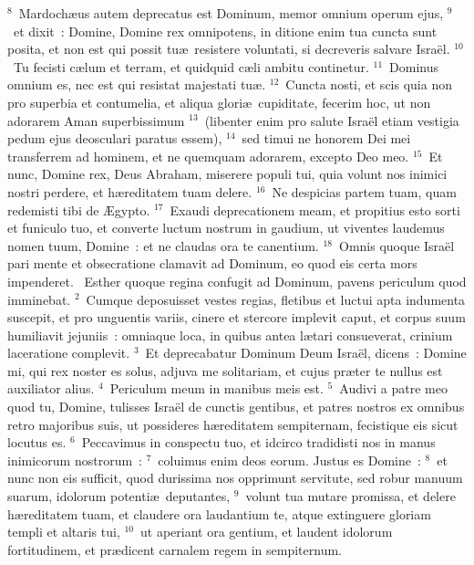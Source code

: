 ${}^{8}$~Mardoch\ae us autem deprecatus est Dominum, memor omnium operum ejus,
${}^{9}$~et dixit~: Domine, Domine rex omnipotens, in ditione enim tua cuncta sunt posita, et non est qui possit tu\ae\ resistere voluntati, si decreveris salvare Isra\"el.
${}^{10}$~Tu fecisti c\ae lum et terram, et quidquid c\ae li ambitu continetur.
${}^{11}$~Dominus omnium es, nec est qui resistat majestati tu\ae .
${}^{12}$~Cuncta nosti, et scis quia non pro superbia et contumelia, et aliqua glori\ae\ cupiditate, fecerim hoc, ut non adorarem Aman superbissimum
${}^{13}$~(libenter enim pro salute Isra\"el etiam vestigia pedum ejus deosculari paratus essem),
${}^{14}$~sed timui ne honorem Dei mei transferrem ad hominem, et ne quemquam adorarem, excepto Deo meo.
${}^{15}$~Et nunc, Domine rex, Deus Abraham, miserere populi tui, quia volunt nos inimici nostri perdere, et h\ae reditatem tuam delere.
${}^{16}$~Ne despicias partem tuam, quam redemisti tibi de \AE gypto.
${}^{17}$~Exaudi deprecationem meam, et propitius esto sorti et funiculo tuo, et converte luctum nostrum in gaudium, ut viventes laudemus nomen tuum, Domine~: et ne claudas ora te canentium.
${}^{18}$~Omnis quoque Isra\"el pari mente et obsecratione clamavit ad Dominum, eo quod eis certa mors impenderet.
~Esther quoque regina confugit ad Dominum, pavens periculum quod imminebat.
${}^{2}$~Cumque deposuisset vestes regias, fletibus et luctui apta indumenta suscepit, et pro unguentis variis, cinere et stercore implevit caput, et corpus suum humiliavit jejuniis~: omniaque loca, in quibus antea l\ae tari consueverat, crinium laceratione complevit.
${}^{3}$~Et deprecabatur Dominum Deum Isra\"el, dicens~: Domine mi, qui rex noster es solus, adjuva me solitariam, et cujus pr\ae ter te nullus est auxiliator alius.
${}^{4}$~Periculum meum in manibus meis est.
${}^{5}$~Audivi a patre meo quod tu, Domine, tulisses Isra\"el de cunctis gentibus, et patres nostros ex omnibus retro majoribus suis, ut possideres h\ae reditatem sempiternam, fecistique eis sicut locutus es.
${}^{6}$~Peccavimus in conspectu tuo, et idcirco tradidisti nos in manus inimicorum nostrorum~:
${}^{7}$~coluimus enim deos eorum. Justus es Domine~:
${}^{8}$~et nunc non eis sufficit, quod durissima nos opprimunt servitute, sed robur manuum suarum, idolorum potenti\ae\ deputantes,
${}^{9}$~volunt tua mutare promissa, et delere h\ae reditatem tuam, et claudere ora laudantium te, atque extinguere gloriam templi et altaris tui,
${}^{10}$~ut aperiant ora gentium, et laudent idolorum fortitudinem, et pr\ae dicent carnalem regem in sempiternum.
